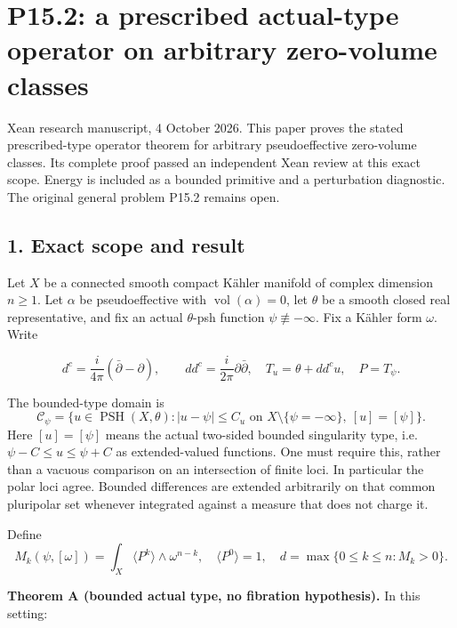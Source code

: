 \documentclass[
  10pt,
]{article}
\author{}
\date{}
\begin{document}
\section{P15.2: a prescribed actual-type operator on arbitrary
zero-volume
classes}\label{p15.2-a-prescribed-actual-type-operator-on-arbitrary-zero-volume-classes}

Xean research manuscript, 4 October 2026. This paper proves the stated
prescribed-type operator theorem for arbitrary pseudoeffective zero-volume
classes. Its complete proof passed an independent Xean review at this
exact scope. Energy is included as a bounded primitive and a perturbation
diagnostic. The original general problem P15.2 remains open.

\subsection{1. Exact scope and result}\label{exact-scope-and-result}

Let \(X\) be a connected smooth compact Kähler manifold of complex
dimension \(n\geq1\). Let \(\alpha\) be pseudoeffective with
\(\operatorname{vol}(\alpha)=0\), let \(\theta\) be a smooth closed real
representative, and fix an actual \(\theta\)-psh function
\(\psi\not\equiv-\infty\). Fix a Kähler form \(\omega\). Write

\[
d^c=\frac{i}{4\pi}(\bar\partial-\partial),\qquad dd^c=\frac{i}{2\pi}\partial\bar\partial,
\quad T_u=\theta+dd^cu,\quad P=T_\psi.
\]

The bounded-type domain is \[
\mathcal{C}_\psi=\{u\in\operatorname{PSH}(X,\theta): |u-\psi|\leq C_u\text{ on }X\setminus\{\psi=-\infty\},\ [u]=[\psi]\}.
\] Here \([u]=[\psi]\) means the actual two-sided bounded singularity
type, i.e.~\(\psi-C\leq u\leq\psi+C\) as extended-valued functions. One
must require this, rather than a vacuous comparison on an intersection
of finite loci. In particular the polar loci agree. Bounded differences
are extended arbitrarily on that common pluripolar set whenever
integrated against a measure that does not charge it.

Define \[
M_k(\psi,[\omega])=\int_X\langle P^k\rangle\wedge\omega^{n-k},\quad
\langle P^0\rangle=1,\quad
d=\max\{0\leq k\leq n:M_k>0\}.
\]

\textbf{Theorem A (bounded actual type, no fibration hypothesis).} In
this setting:
\end{document}
